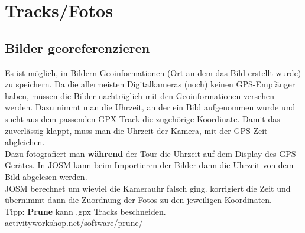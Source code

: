 \documentclass[a4paper,11pt,notumble]{leaflet}
\begin{document}
\section*{Tracks/Fotos}

\subsection*{Bilder georeferenzieren} Es ist möglich, in Bildern Geoinformationen (Ort an dem das Bild erstellt wurde) zu 
speichern. Da die allermeisten Digitalkameras (noch) keinen GPS-Empfänger haben, müssen die Bilder nachträglich mit 
den Geoinformationen versehen werden. Dazu nimmt man die Uhrzeit, an der ein Bild aufgenommen wurde und sucht aus dem 
passenden GPX-Track die zugehörige Koordinate. Damit das zuverlässig klappt, muss man die Uhrzeit der Kamera, mit der 
GPS-Zeit abgleichen. \\
Dazu fotografiert man \textbf{während} der Tour die Uhrzeit auf dem Display des GPS-Gerätes.  
In JOSM kann beim Importieren der Bilder dann die Uhrzeit von dem Bild abgelesen werden. \\
JOSM berechnet um wieviel die Kamerauhr falsch ging. korrigiert die Zeit und übernimmt dann die Zuordnung der Fotos zu den jeweiligen Koordinaten. \\

Tipp: \textbf{Prune} kann .gpx Tracks beschneiden. 
\href{http://activityworkshop.net/software/prune/}{activityworkshop.net/software/prune/}

\newpage
\end{document}
